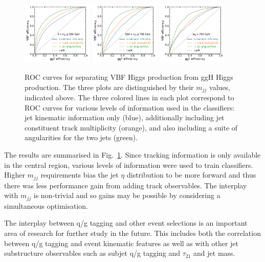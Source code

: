 \documentclass[11pt]{cernrep}
\begin{document}
\begin{figure}[h!]
  \centering
\includegraphics[width=0.3\textwidth]{figs/Mjj-0-350-ROC.pdf}
\includegraphics[width=0.3\textwidth]{figs/Mjj-350-700-ROC.pdf}
\includegraphics[width=0.3\textwidth]{figs/Mjj-700-inf-ROC.pdf}
  \caption{ROC curves for separating VBF Higgs production from ggH Higgs production.  The three plots are distinguished by their $m_{jj}$ values, indicated above.  The three colored lines in each plot correspond to ROC curves for various levels of information used in the classifiers: jet kinematic information only (blue), additionally including jet constituent track multiplicity (orange), and also including a suite of angularities for the two jets (green).}
  \label{fig:jets:qg}
\end{figure}
The results are summarised in Fig.~\ref{fig:jets:qg}.  Since tracking information is only available in the central region, various levels of information were used to train classifiers.  Higher $m_{jj}$ requirements bias the jet $\eta$ distribution to be more forward and thus there was less performance gain from adding track observables.  The interplay with $m_{jj}$ is non-trivial and so gains may be possible by considering a simultaneous optimisation.

The interplay between q/g tagging and other event selections is an important area of research for further study in the future.  This includes both the correlation between q/g tagging and event kinematic features as well as with other jet substructure observables such as subjet q/g tagging and $\tau_{21}$ and jet mass.
\end{document}
